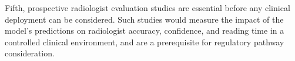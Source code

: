 \documentclass{article}
\begin{document}
Fifth, prospective radiologist evaluation studies are essential before any clinical
deployment can be considered. Such studies would measure the impact of the model's
predictions on radiologist accuracy, confidence, and reading time in a controlled
clinical environment, and are a prerequisite for regulatory pathway consideration.

\cleardoublepage


\end{document}

